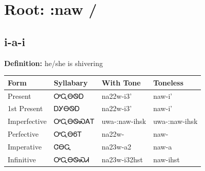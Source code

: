 \documentclass{article}%
\begin{document}
%
\normalsize%
\section*{Root: :naw / }%
\subsection*{i-a-i}%
\textbf{Definition: }%
he/she is shivering%
\\[0.5em]%
\begin{tabular}{|l|l|l|l|}%
\hline%
\textbf{Form}&\textbf{Syllabary}&\textbf{With Tone}&\textbf{Toneless}\\%
\hline%
Present&ᎤᏩᎾᏫᎠ&na22w{-}i3'&naw{-}i'\\%
1st Present&ᎠᎩᎾᏫᎠ&na22w{-}i3'&naw{-}i'\\%
Imperfective&ᎤᏩᎾᏫᏍᎪᎢ&uwa{-}:naw{-}ihsk&uwa{-}:naw{-}ihsk\\%
Perfective&ᎤᏩᎾᏮᎢ&na22w{-}&naw{-}\\%
Imperative&ᏣᎾᏩ&na23w{-}a2&naw{-}a\\%
Infinitive&ᎤᏩᎾᏫᏍᏗ&na23w{-}i32hst&naw{-}ihst\\%
\hline%
\end{tabular}%
\\[1em]%
\end{document}
